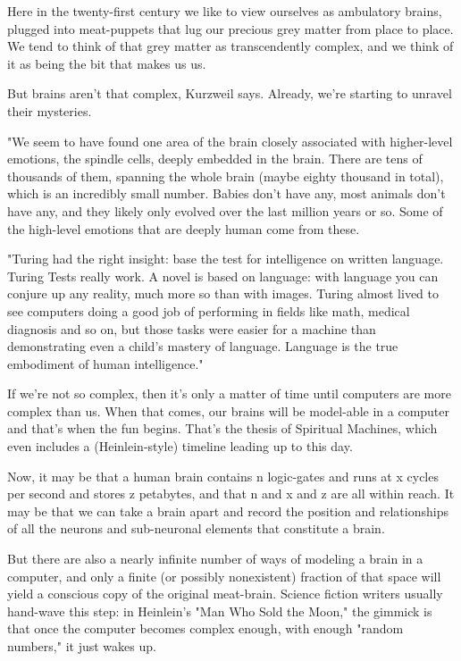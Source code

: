 Here in the twenty-first century we like to view ourselves as
ambulatory brains, plugged into meat-puppets that lug our precious
grey matter from place to place. We tend to think of that grey
matter as transcendently complex, and we think of it as being the
bit that makes us us.

But brains aren't that complex, Kurzweil says. Already, we're
starting to unravel their mysteries.

"We seem to have found one area of the brain closely associated
with higher-level emotions, the spindle cells, deeply embedded in
the brain. There are tens of thousands of them, spanning the whole
brain (maybe eighty thousand in total), which is an incredibly
small number. Babies don't have any, most animals don't have any,
and they likely only evolved over the last million years or so.
Some of the high-level emotions that are deeply human come from
these.

"Turing had the right insight: base the test for intelligence on
written language. Turing Tests really work. A novel is based on
language: with language you can conjure up any reality, much more
so than with images. Turing almost lived to see computers doing a
good job of performing in fields like math, medical diagnosis and
so on, but those tasks were easier for a machine than demonstrating
even a child's mastery of language. Language is the true embodiment
of human intelligence."

If we're not so complex, then it's only a matter of time until
computers are more complex than us. When that comes, our brains
will be model-able in a computer and that's when the fun begins.
That's the thesis of Spiritual Machines, which even includes a
(Heinlein-style) timeline leading up to this day.

Now, it may be that a human brain contains n logic-gates and runs
at x cycles per second and stores z petabytes, and that n and x and
z are all within reach. It may be that we can take a brain apart
and record the position and relationships of all the neurons and
sub-neuronal elements that constitute a brain.

But there are also a nearly infinite number of ways of modeling a
brain in a computer, and only a finite (or possibly nonexistent)
fraction of that space will yield a conscious copy of the original
meat-brain. Science fiction writers usually hand-wave this step: in
Heinlein's "Man Who Sold the Moon," the gimmick is that once the
computer becomes complex enough, with enough "random numbers," it
just wakes up.

